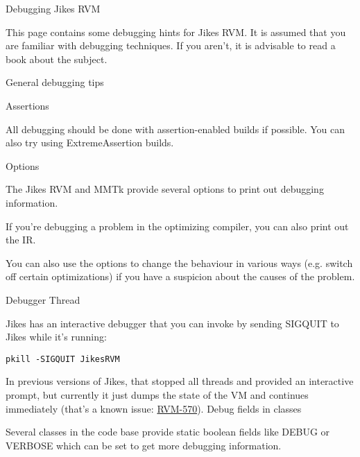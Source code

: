 \begin{section}{Debugging Jikes RVM}
\label{sec:debuggingjikesrvm}

This page contains some debugging hints for Jikes RVM. It is assumed that you are familiar with debugging techniques. If you aren't, it is advisable to read a book about the subject.

\begin{subsection}{General debugging tips}

\begin{subsubsection}{Assertions}

All debugging should be done with assertion-enabled builds if possible. You can also try using ExtremeAssertion builds.

\end{subsubsection}

\begin{subsubsection}{Options}

The Jikes RVM and MMTk provide several options to print out debugging information.

If you're debugging a problem in the optimizing compiler, you can also print out the IR.

You can also use the options to change the behaviour in various ways (e.g. switch off certain optimizations) if you have a suspicion about the causes of the problem.

\end{subsubsection}

\begin{subsubsection}{Debugger Thread}

Jikes has an interactive debugger that you can invoke by sending SIGQUIT to Jikes while it's running:

\begin{lstlisting}
pkill -SIGQUIT JikesRVM
\end{lstlisting}

In previous versions of Jikes, that stopped all threads and provided an interactive prompt, but currently it just dumps the state of the VM and continues immediately (that's a known issue: \href{https://xtenlang.atlassian.net/browse/RVM-570}{RVM-570}).
Debug fields in classes

Several classes in the code base provide static boolean fields like DEBUG or VERBOSE which can be set to get more debugging information.

\end{subsubsection}


\end{subsection}
\end{section}
